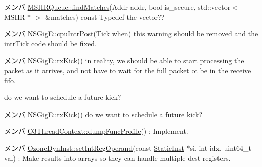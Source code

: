 \label{todo__todo000078}
\hypertarget{todo__todo000078}{}
 
\begin{DoxyDescription}
\item[メンバ \hyperlink{classMSHRQueue_a020dd5bb628863baf3800f816cfba197}{MSHRQueue::findMatches}(Addr addr, bool is\_\-secure, std::vector$<$ MSHR $\ast$ $>$ \&matches) const  ]Typedef the vector?? 
\end{DoxyDescription}

\label{todo__todo000066}
\hypertarget{todo__todo000066}{}
 
\begin{DoxyDescription}
\item[メンバ \hyperlink{classNSGigE_af1fc872917f4ac5efa0d55c5c139bc9a}{NSGigE::cpuIntrPost}(Tick when) ]this warning should be removed and the intrTick code should be fixed. 
\end{DoxyDescription}

\label{todo__todo000067}
\hypertarget{todo__todo000067}{}
 
\begin{DoxyDescription}
\item[メンバ \hyperlink{classNSGigE_a5fa946a73db6f59c9819d457c991486a}{NSGigE::rxKick}() ]in reality, we should be able to start processing the packet as it arrives, and not have to wait for the full packet ot be in the receive fifo. 

do we want to schedule a future kick? 
\end{DoxyDescription}

\label{todo__todo000069}
\hypertarget{todo__todo000069}{}
 
\begin{DoxyDescription}
\item[メンバ \hyperlink{classNSGigE_ac5484e8debdd6a2d3cf4c2902b832a76}{NSGigE::txKick}() ]do we want to schedule a future kick? 
\end{DoxyDescription}

\label{todo__todo000040}
\hypertarget{todo__todo000040}{}
 
\begin{DoxyDescription}
\item[メンバ \hyperlink{classO3ThreadContext_a13fa12d1779a94a1e0b968946a1367c7}{O3ThreadContext::dumpFuncProfile}() ]: Implement. 
\end{DoxyDescription}

\label{todo__todo000041}
\hypertarget{todo__todo000041}{}
 
\begin{DoxyDescription}
\item[メンバ \hyperlink{classOzoneDynInst_a654e99f2be7cd298378462ce9651bb44}{OzoneDynInst::setIntRegOperand}(const \hyperlink{classStaticInst}{StaticInst} $\ast$si, int idx, uint64\_\-t val) ]: Make results into arrays so they can handle multiple dest registers. 
\end{DoxyDescription}


